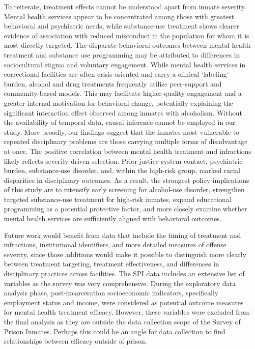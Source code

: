 \documentclass[
]{article}
\begin{document}
To reiterate, treatment effects cannot be understood apart from inmate
severity. Mental health services appear to be concentrated among those
with greatest behavioral and psychiatric needs, while substance-use
treatment shows clearer evidence of association with reduced misconduct
in the population for whom it is most directly targeted. The disparate
behavioral outcomes between mental health treatment and substance use
programming may be attributed to differences in sociocultural stigma and
voluntary engagement. While mental health services in correctional
facilities are often crisis-oriented and carry a clinical `labeling'
burden, alcohol and drug treatments frequently utilize peer-support and
community-based models. This may facilitate higher-quality engagement
and a greater internal motivation for behavioral change, potentially
explaining the significant interaction effect observed among inmates
with alcoholism. Without the availability of temporal data, causal
inference cannot be employed in our study. More broadly, our findings
suggest that the inmates most vulnerable to repeated disciplinary
problems are those carrying multiple forms of disadvantage at once. The
positive correlation between mental health treatment and infractions
likely reflects severity-driven selection. Prior justice-system contact,
psychiatric burden, substance-use disorder, and, within the high-risk
group, marked racial disparities in disciplinary outcomes. As a result,
the strongest policy implications of this study are to intensify early
screening for alcohol-use disorder, strengthen targeted substance-use
treatment for high-risk inmates, expand educational programming as a
potential protective factor, and more closely examine whether mental
health services are sufficiently aligned with behavioral outcomes.

Future work would benefit from data that include the timing of treatment
and infractions, institutional identifiers, and more detailed measures
of offense severity, since those additions would make it possible to
distinguish more clearly between treatment targeting, treatment
effectiveness, and differences in disciplinary practices across
facilities. The SPI data includes an extensive list of variables as the
survey was very comprehensive. During the exploratory data analysis
phase, post-incarceration socioeconomic indicators, specifically
employment status and income, were considered as potential outcome
measures for mental health treatment efficacy. However, these variables
were excluded from the final analysis as they are outside the data
collection scope of the Survey of Prison Inmates. Perhaps this could be
an angle for data collection to find relationships between efficacy
outside of prison.
\end{document}
